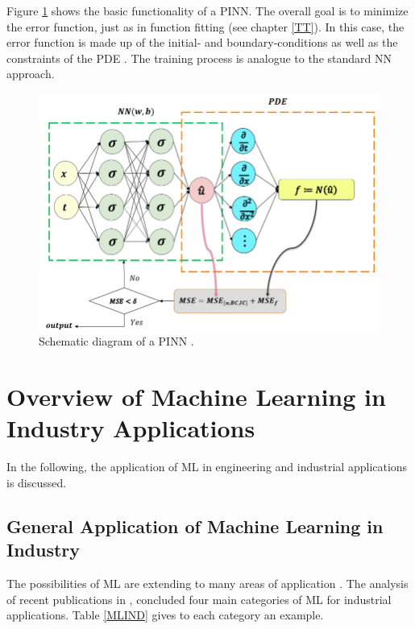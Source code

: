 Figure \ref{fig:piml} shows the basic functionality of a PINN. The overall goal is to minimize the error function, just as in function fitting (see chapter \ref{TT}). In this case, the error function is made up of the initial- and boundary-conditions as well as the constraints of the PDE \cite{Guo}. The training process is analogue to the standard NN approach. 
\begin{figure}[H]
	\centering
	\includegraphics[width=0.7\linewidth]{IMGs/piml.png}
	\caption{Schematic diagram of a PINN \cite{Guo}.}
	\label{fig:piml}
\end{figure}




\newpage
\section{Overview of Machine Learning in Industry Applications}
In the following, the application of ML in engineering and industrial applications is discussed.
\subsection{General Application of Machine Learning in Industry}
The possibilities of ML are extending to many areas of application \cite{Deiana}. The analysis of recent publications in \cite{Bertolini}, concluded four main categories of ML for industrial applications. Table \ref{MLIND} gives to each category an example.

